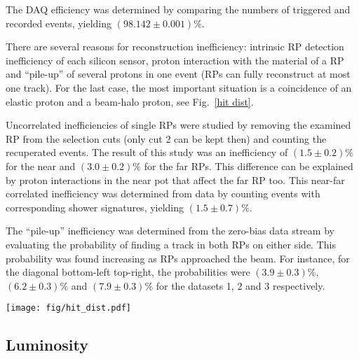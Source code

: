 \documentclass[doublecol]{../macros/epl2}
\def\un#1{\,{\rm #1}}
\begin{document}
The DAQ efficiency was determined by comparing the numbers of triggered and recorded events, yielding $(98.142 \pm 0.001)\%$.

There are several reasons for reconstruction inefficiency: intrinsic RP detection inefficiency of each silicon sensor, proton interaction with the material of a RP and ``pile-up'' of several protons in one event (RPs can fully reconstruct at most one track). For the last case, the most important situation is a coincidence of an elastic proton and a beam-halo proton, see Fig.~\ref{hit dist}.

Uncorrelated inefficiencies of single RPs were studied by removing the examined RP from the selection cuts (only cut 2 can be kept then) and counting the recuperated events. The result of this study was an inefficiency of $(1.5 \pm 0.2)\%$ for the near and $(3.0 \pm 0.2)\%$ for the far RPs. This difference can be explained by proton interactions in the near pot that affect the far RP too. This near-far correlated inefficiency was determined from data by counting events with corresponding shower signatures, yielding $(1.5\pm 0.7)\%$.

The ``pile-up'' inefficiency was determined from the zero-bias data stream by evaluating the probability of finding a track in both RPs on either side. This probability was found increasing as RPs approached the beam. For instance, for the diagonal bottom-left top-right, the probabilities were $(3.9 \pm 0.3)\%$, $(6.2 \pm 0.3)\%$ and $(7.9 \pm 0.3)\%$ for the datasets 1, 2 and 3 respectively.


\begin{figure*}
\begin{center}
\texttt{[image: fig/hit\_dist.pdf]}
\vskip-5mm
\caption{Hit distributions from dataset 3 in the far unit of the $220\un{m}$ station, right arm. Left: with diagonal cut only, Right: with all the elastic selection cuts (see Tab.~\ref{cuts}). The left plot clearly indicates the presence of the beam halo, which is eliminated by the selection cuts (the right plot). The distribution of elastic hits in right plot is sharply cut at about $|y| = 29\un{mm}$ which is a consequence of the LHC aperture limitations. }
\label{hit dist}
\end{center}
\end{figure*}

\subsection{Luminosity}
\end{document}
